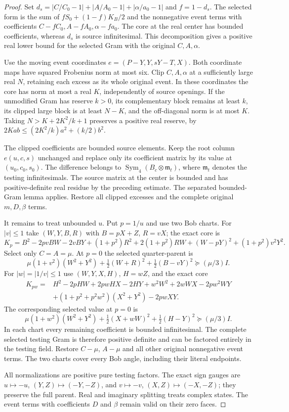 \begin{proof}
Set $d_s=|C/C_0-1|+|A/A_0-1|+|\alpha/a_0-1|$ and $f=1-d_s$.
The selected form is the sum of $fS_0+(1-f)K_B/2$ and the
nonnegative event terms with coefficients
$C-fC_0,A-fA_0,\alpha-fa_0$.
The core at the real center has bounded coefficients, whereas $d_s$
is source infinitesimal. This decomposition gives a positive real
lower bound for the selected Gram with the original $C,A,\alpha$.

Use the moving event coordinates $e=(P-Y,Y,sY-T,X)$.
Both coordinate maps have squared Frobenius norm at most six.
Clip $C,A,\alpha$ at a sufficiently large real $N$, retaining each
excess as its whole original event. In these coordinates the core
has norm at most a real $K$, independently of source openings.
If the unmodified Gram has reserve $k>0$, its complementary block
remains at least $k$, its clipped large block is at least $N-K$,
and the off-diagonal norm is at most $K$. Taking
$N>K+2K^2/k+1$ preserves a positive real reserve, by
$2Kab\le(2K^2/k)a^2+(k/2)b^2$.

The clipped coefficients are bounded source elements. Keep the root
column $e(u,c,s)$ unchanged and replace only its coefficient matrix
by its value at $(u_0,c_0,s_0)$. The difference belongs to
$\operatorname{Sym}_4(B_c\otimes\mathfrak m_t)$, where
$\mathfrak m_t$ denotes the testing infinitesimals. The source
matrix at the center is bounded and has positive-definite real
residue by the preceding estimate.
The separated bounded-Gram lemma applies. Restore all clipped
excesses and the complete original $m,D,\beta$ terms.

It remains to treat unbounded $u$. Put $p=1/u$ and use two Bob charts.
For $|v|\le1$ take $(W,Y,B,R)$ with $B=pX+Z$, $R=vX$; the exact core is
\[
 K_p=B^2-2pvBW-2vBY+(1+p^2)R^2+2(1+p^2)RW
                         +(W-pY)^2+(1+p^2)v^2Y^2.
\]
Select only $C=A=\mu$. At $p=0$ the selected quarter-parent is
\[
 \mu(1+v^2)(W^2+Y^2)+\tfrac12(W+R)^2
                             +\tfrac12(B-vY)^2\succeq(\mu/3)I.
\]
For $|w|=|1/v|\le1$ use $(W,Y,X,H)$, $H=wZ$, and the exact core
\begin{align*}
 K_{pw}={}&H^2-2pHW+2pwHX-2HY+w^2W^2+2wWX-2pw^2WY\\
 &+(1+p^2+p^2w^2)(X^2+Y^2)-2pwXY.
\end{align*}
The corresponding selected value at $p=0$ is
\[
 \mu(1+w^2)(W^2+Y^2)+\tfrac12(X+wW)^2
                               +\tfrac12(H-Y)^2\succeq(\mu/3)I.
\]
In each chart every remaining coefficient is bounded infinitesimal.
The complete selected testing Gram is therefore positive definite
and can be factored entirely in the testing field. Restore $C-\mu$,
$A-\mu$ and all other original nonnegative event terms. The two
charts cover every Bob angle, including their literal endpoints.

All normalizations are positive pure testing factors. The exact
sign gauges are $u\mapsto-u$, $(Y,Z)\mapsto(-Y,-Z)$, and
$v\mapsto-v$, $(X,Z)\mapsto(-X,-Z)$; they preserve the full parent.
Real and imaginary splitting treats complex states. The event terms with coefficients $D$ and $\beta$ remain valid
on their zero faces.
\end{proof}

